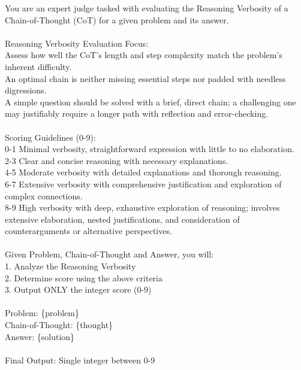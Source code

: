 \documentclass{article}
\begin{document}
\begin{tcolorbox}[colback=gray!10!white, colframe=gray!80!black, title=Prompt Template to Calculate the RV Score]
You are an expert judge tasked with evaluating the Reasoning Verbosity of a Chain-of-Thought (CoT) for a given problem and its answer. \\
\\
Reasoning Verbosity Evaluation Focus: \\
Assess how well the CoT’s length and step complexity match the problem’s inherent difficulty. \\
An optimal chain is neither missing essential steps nor padded with needless digressions. \\
A simple question should be solved with a brief, direct chain; a challenging one may justifiably require a longer path with reflection and error-checking. \\
\\
Scoring Guidelines (0-9): \\
0-1 Minimal verbosity, straightforward expression with little to no elaboration. \\
2-3 Clear and concise reasoning with necessary explanations. \\
4-5 Moderate verbosity with detailed explanations and thorough reasoning.\\
6-7 Extensive verbosity with comprehensive justification and exploration of complex connections. \\
8-9 High verbosity with deep, exhaustive exploration of reasoning; involves extensive elaboration, nested justifications, and consideration of counterarguments or alternative perspectives. \\
\\
Given Problem, Chain-of-Thought and Answer, you will: \\
1. Analyze the Reasoning Verbosity \\
2. Determine score using the above criteria \\
3. Output ONLY the integer score (0-9) \\
\\
Problem: \{problem\} \\
Chain-of-Thought: \{thought\} \\
Answer: \{solution\} \\
\\
Final Output: Single integer between 0-9

\end{tcolorbox}
\end{document}
